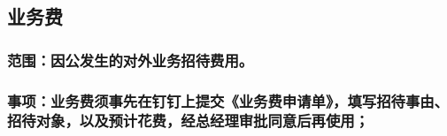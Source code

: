 \documentclass[16pt]{article}
\begin{document}

\subsection{业务费}

\subsubsection{范围：因公发生的对外业务招待费用。}
\subsubsection{事项：业务费须事先在钉钉上提交《业务费申请单》，填写招待事由、招待对象，以及预计花费，经总经理审批同意后再使用；}
\end{document}
